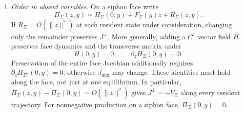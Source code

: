 \begin{enumerate}
\item \emph{Order in absent variables.}
On a siphon face write
\[
 \Pi_\Sigma(z,y)=\Pi_\Sigma(0,y)+F_\Sigma(y)z+R_\Sigma(z,y).
\]
If $R_\Sigma=O(\|z\|^2)$ at each resident state under consideration,
changing only the remainder preserves $J^\perp$.
More generally, adding a $C^1$ vector field $H$ preserves face dynamics
and the transverse matrix under
\[
 H(0,y)=0,\qquad \partial_zH_\Sigma(0,y)=0.
\]
Preservation of the entire face Jacobian additionally requires
$\partial_zH_{\Sigma^c}(0,y)=0$; otherwise $J_{\mathrm{mix}}$ may change.
These identities must hold along the face, not just at one equilibrium.
In particular, $\Pi_\Sigma(z,y)-\Pi_\Sigma(0,y)=O(\|z\|^2)$ gives
$J^\perp=-V_\Sigma$ along every resident trajectory.
For nonnegative production on a siphon face, $\Pi_\Sigma(0,y)=0$.
\end{enumerate}
\eeP
